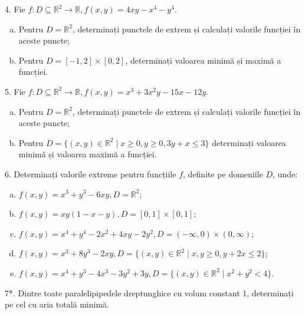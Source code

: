\documentclass[11pt,a4paper]{article}
\newcommand\seq{\subseteq}
\newcommand\RR{\mathbb{R}}
\theoremstyle{dotless}
\theoremstyle{dotlessdr}
\begin{document}
4. Fie $f : D \seq \RR^2 \to \RR, f(x, y) = 4xy - x^4 - y^4$.
\begin{enumerate}[(a)]
\item Pentru $D = \RR^2$, determinați punctele de extrem și calculați valorile
  funcției în aceste puncte;
\item Pentru $D = [-1, 2] \times [0, 2]$, determinați valoarea minimă și
  maximă a funcției.
\end{enumerate}

\vspace{1cm}

5. Fie $f : D \seq \RR^2 \to \RR, f(x, y) = x^3 + 3x^2 y - 15x - 12 y$.
\begin{enumerate}[(a)]
\item Pentru $D = \RR^2$, determinați punctele de extrem și calculați
  valorile funcției în aceste puncte;
\item Pentru $D = \{ (x, y) \in \RR^2 \mid x \geq 0, y \geq 0, 3y + x \leq 3 \}$
  determinați valoarea minimă și valoarea maximă a funcției.
\end{enumerate}

\vspace{1cm}

6. Determinați valorile extreme pentru funcțiile $f$, definite pe domeniile $D$,
unde:
\begin{enumerate}[(a)]
\item $f(x, y) = x^3 + y^3 - 6xy, D = \RR^2$;
\item $f(x, y) = xy(1 - x - y), D = [0, 1] \times [0, 1]$;
\item $f(x, y) = x^4 + y^4 - 2x^2 + 4xy - 2y^2, D = (-\infty, 0) \times (0, \infty)$;
\item $f(x, y) = x^3 + 8y^3 - 2xy, D = \{(x, y) \in \RR^2 \mid x, y \geq 0, y + 2x \leq 2\}$;
\item $f(x, y) = x^4 + y^3 - 4x^3 - 3y^2 + 3y, D = \{ (x, y) \in \RR^2 \mid x^2 + y^2 < 4 \}$.
\end{enumerate}

\vspace{1cm}

7*. Dintre toate paralelipipedele dreptunghice cu volum constant 1, determinați
pe cel cu aria totală minimă.
\end{document}
